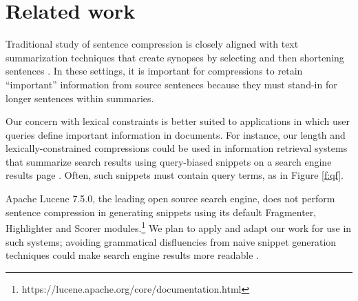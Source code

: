 \documentclass[11pt,a4paper]{article}
\newcommand{\ahcomment}[1]{\textcolor{blue}{[#1 -AH]}}
\begin{document}


\section{Related work}

Traditional study of sentence compression is closely aligned with text summarization techniques that create synopses by selecting and then shortening sentences \cite{Knight2000StatisticsBasedS,vanderwende2007beyond,clarke2008global,martins2009summarization,Nenkova2012ASO}. 
In these settings, it is important for compressions to retain ``important'' information from source sentences because they must stand-in for longer sentences within summaries.

Our concern with lexical constraints is better suited to applications in which user queries define important information in documents. For instance, our length and lexically-constrained compressions could be used in information retrieval systems that summarize search results using query-biased snippets on a search engine results page \cite{tombros1998advantages,Metzler2008MachineLS}. Often, such snippets must contain query terms, as in Figure \ref{f:qf}. 

Apache Lucene 7.5.0, the leading open source search engine, does not perform sentence compression in generating snippets using its default Fragmenter, Highlighter and Scorer modules.\footnote{https://lucene.apache.org/core/documentation.html} We plan to apply and adapt our work for use in such systems; avoiding grammatical disfluencies from naive snippet generation techniques could make search engine results more readable \cite{kanungo2009predicting}.
\end{document}
